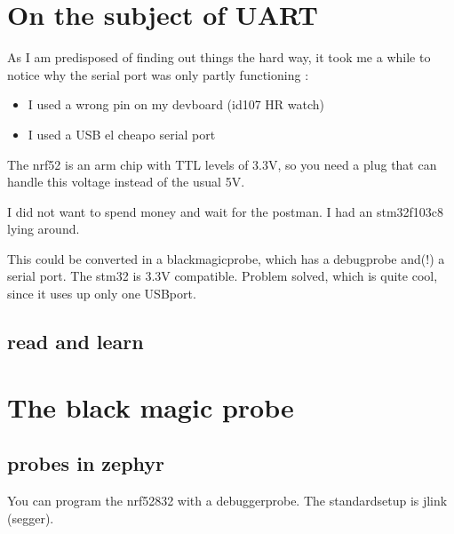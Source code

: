 \documentclass[letterpaper,10pt,english]{sphinxmanual}
\begin{document}
\chapter{On the subject of UART}
\label{\detokenize{uart:on-the-subject-of-uart}}\label{\detokenize{uart::doc}}
As I am predisposed of finding out things the hard way, it took me a while to notice why the serial port was only partly functioning :
\begin{itemize}
\item {} 
I used a wrong pin on my dev\sphinxhyphen{}board (id107 HR watch)

\item {} 
I used a USB \sphinxhyphen{} el cheapo \sphinxhyphen{} serial port

\end{itemize}

The nrf52 is an arm chip with TTL levels of 3.3V, so you need a plug that can handle this voltage instead of the usual 5V.

I did not want to spend money and wait for the postman.
I had an stm32f103c8 lying around.

This could be converted in a blackmagicprobe, which has a debugprobe and(!) a serial port. The stm32 is 3.3V compatible. Problem solved, which is quite cool, since it uses up only one USB\sphinxhyphen{}port.


\section{read and learn}
\label{\detokenize{uart:read-and-learn}}
\begin{sphinxVerbatim}[commandchars=\\\{\}]
         
   
\end{sphinxVerbatim}


\chapter{The black magic probe}
\label{\detokenize{blackmagicprobe:the-black-magic-probe}}\label{\detokenize{blackmagicprobe::doc}}

\section{probes in zephyr}
\label{\detokenize{blackmagicprobe:probes-in-zephyr}}
You can program the nrf52832 with a debuggerprobe.
The standard\sphinxhyphen{}setup is jlink (segger).
\end{document}
